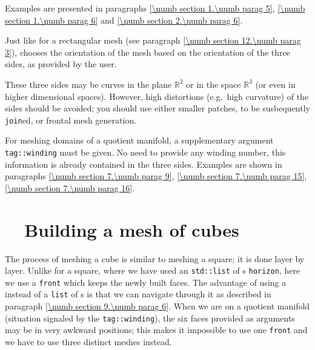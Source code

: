 Examples are presented in paragraphs \ref{\numb section 1.\numb parag 5},
\ref{\numb section 1.\numb parag 6} and \ref{\numb section 2.\numb parag 6}.

Just like for a rectangular mesh (see paragraph \ref{\numb section 12.\numb parag 3}),
{\maniFEM} chooses the orientation of the mesh based on the orientation of the three sides,
as provided by the user.

These three sides may be curves in the plane $ \mathbb{R}^2 $ or in the space $ \mathbb{R}^3 $
(or even in higher dimensional spaces).
However, high distortions (e.g.\ high curvature) of the sides should be avoided;
you should use either smaller patches, to be susbequently {\small\tt join}ed,
or frontal mesh generation.

For meshing domains of a quotient manifold, a supplementary argument
{\small\tt\textcolor{tag}{tag}::winding} must be given.
No need to provide any winding number, this information is already contained in the three sides.
Examples are shown in paragraphs \ref{\numb section 7.\numb parag 9},
\ref{\numb section 7.\numb parag 15}, \ref{\numb section 7.\numb parag 16}.


\section{~~Building a mesh of cubes}\label{\numb section 12.\numb parag 5}

The process of meshing a cube is similar to meshing a square; it is done layer by layer.
Unlike for a square, where we have used an {\small\tt std::list} of {\small\tt{}}s
{\small\tt horizon}, here we use a {\small\tt{}} {\small\tt front} which
keeps the newly built faces.
The advantage of using a {\small\tt{}} instead of a {\small\tt list} of
{\small\tt{}}s is that we can navigate through it as described in paragraph
\ref{\numb section 9.\numb parag 6}.
When we are on a quotient manifold (situation signaled by the {\small\tt\textcolor{tag}{tag}::winding}),
the six faces  provided as arguments may be in very awkward positions;
this makes it impossible to use one {\small\tt{}} {\small\tt front} and we have
to use three distinct meshes instead.

